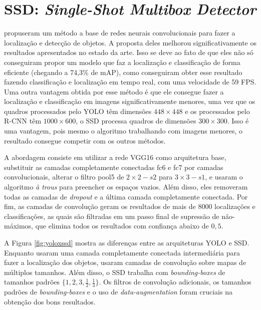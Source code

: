 \section{SSD: \textit{Single-Shot Multibox Detector}}
\label{secao:3:2}

 propuseram um método a base de redes neurais convolucionais para fazer a localização e detecção de objetos. A proposta deles melhorou significativamente os resultados apresentados no estado da arte. Isso se deve ao fato de que eles não só conseguiram propor um modelo que faz a localização e classificação de forma eficiente (chegando a 74,3\% de \ac{mAP}), como conseguiram obter esse resultado fazendo classificação e localização em tempo real, com uma velocidade de 59 \ac{FPS}. Uma outra vantagem obtida por esse método é que ele consegue fazer a localização e classificação em imagens significativamente menores, uma vez que os quadros processados pelo \ac{YOLO} têm dimensões $448 \times 448$ e os processados pelo \ac{R-CNN} têm $1000\times 600$, o \ac{SSD} processa quadros de dimensões $300 \times 300$. Isso é uma vantagem, pois mesmo o algoritmo trabalhando com imagens menores, o resultado consegue competir com os outros métodos.

A abordagem consiste em utilizar a rede VGG16 \cite{simonyan-2014} como arquitetura base, substituir as camadas completamente conectadas fc6 e fc7 por camadas convolucionais, alterar o filtro pool5 de $2 \times 2 - s2$ para $3 \times 3 - s1$, e usaram o algoritmo \textit{à trous}\cite{holschneider-1990} para preencher os espaços vazios. Além disso, eles removeram todas as camadas de \textit{dropout} e a última camada completamente conectada. Por fim, as camadas de convolução geram os resultados de mais de 8000 localizações e classificações, as quais são filtradas em um passo final de supressão de não-máximos, que elimina todos os resultados com confiança abaixo de $0,5$.

A Figura \ref{fig:yoloxssd} mostra as diferenças entre as arquiteturas \ac{YOLO} e \ac{SSD}. Enquanto  usaram uma camada completamente conectada intermediária para fazer a localização dos objetos,  usaram camadas de convolução sobre mapas de múltiplos tamanhos. Além disso, o \ac{SSD} trabalha com \textit{bounding-boxes} de tamanhos padrões $\{1, 2, 3, \frac{1}{2}, \frac{1}{3}\}$. Os filtros de convolução adicionais, os tamanhos padrões de \textit{bounding-boxes} e o uso de \textit{data-augmentation} foram cruciais na obtenção dos bons resultados.

